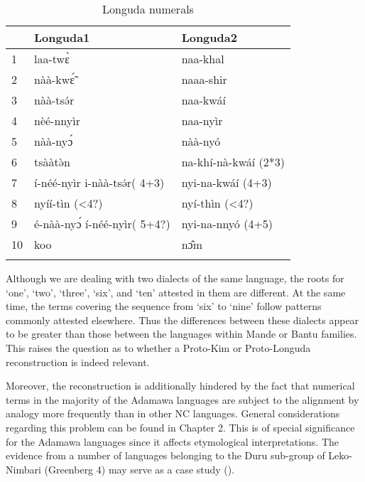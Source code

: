 \begin{table}
\caption{\label{tab:3:99}Longuda numerals}


\begin{tabularx}{\textwidth}{lXX} 
\lsptoprule
& {Longuda1} & {Longuda2}\\
\midrule
1 & laa-tw{\`{ɛ}} & naa-khal\\
2 & nàà-kw{\'{\~ɛ}} & naaa-shir\\
3 & nàà-ts{\'{ə}}r & naa-kwáí\\
4 & nèé-nnyìr & naa-nyìr\\
5 & nàà-ny{\'{ɔ}} & nàà-nyó\\
6 & tsààt{\`{ə}}n & na-khí-nà-kwáí (2*3)\\
7 & í-néé-nyìr i-nàà-ts{\'{ə}}r( 4+3) & nyi-na-kwáí (4+3)\\
8 & nyíí-tìn (<4?) & nyí-thìn (<4?)\\
9 & é-nàà-ny{\'{ɔ}} í-néé-nyìr( 5+4?) & nyi-na-nnyó (4+5)\\
10 & koo & n{\^{ɔ}}m\\
\lspbottomrule
\end{tabularx}
\end{table}

Although we are dealing with two dialects of the same language, the roots for ‘one’, ‘two’, ‘three’, ‘six’, and ‘ten’ attested in them are different. At the same time, the terms covering the sequence from ‘six’ to ‘nine’ follow patterns commonly attested elsewhere. Thus the differences between these dialects appear to be greater than those between the languages within Mande or Bantu families. This raises the question as to whether a Proto-Kim or Proto-Longuda reconstruction is indeed relevant.

Moreover, the reconstruction is additionally hindered by the fact that numerical terms in the majority of the Adamawa languages are subject to the alignment by analogy more frequently than in other NC languages. General considerations regarding this problem can be found in Chapter 2. This is of special significance for the Adamawa languages since it affects etymological interpretations. The evidence from a number of languages belonging to the Duru sub-group of Leko-Nimbari (Greenberg 4) may serve as a case study ().

